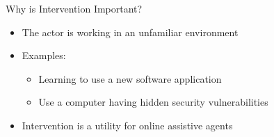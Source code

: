 \begin{frame}{Why is Intervention Important?}
	\begin{itemize}
		\item The actor is working in an unfamiliar environment
		\item Examples:
		\begin{itemize}
		\item Learning to use a new software application
		\item Use a computer having hidden security vulnerabilities
		\end{itemize}
		\item Intervention is a utility for online assistive agents
	\end{itemize}
\end{frame}
